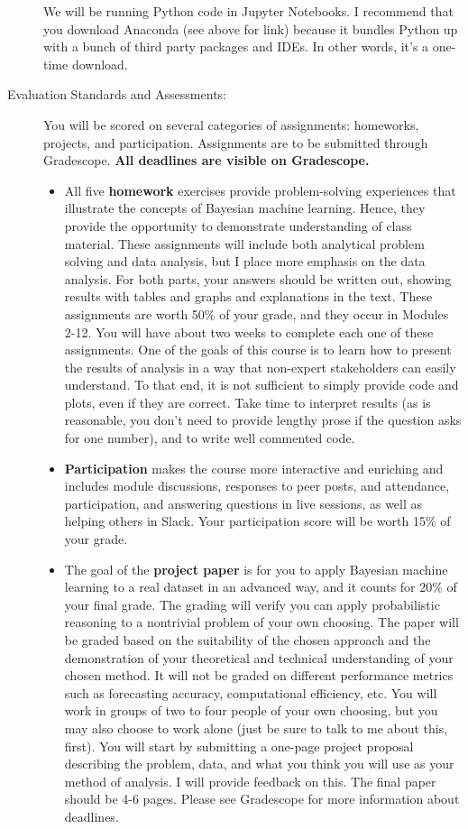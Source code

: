 \documentclass[11pt]{article}
\begin{document}
\begin{description}
We will be running Python code in Jupyter Notebooks. I recommend that you download Anaconda (see above for link) because it bundles Python up with a bunch of third party packages and IDEs. In other words, it's a one-time download. 

\item[Evaluation Standards and Assessments:] 

You will be scored on several categories of assignments: homeworks, projects, and participation. Assignments are to be submitted through Gradescope. {\bf All deadlines are visible on Gradescope.}

\begin{itemize}
\item All five {\bf homework} exercises provide problem-solving experiences that illustrate the concepts of Bayesian machine learning. Hence, they provide the opportunity to demonstrate understanding of class material. These assignments will include both analytical problem solving and data analysis, but I place more emphasis on the data analysis. For both parts, your answers should be written out, showing results with tables and graphs and explanations in the text. These assignments are worth 50\% of your grade, and they occur in Modules 2-12. You will have about two weeks to complete each one of these assignments. One of the goals of this course is to learn how to present the results of analysis in a way that non-expert stakeholders can easily understand. To that end, it is not sufficient to simply provide code and plots, even if they are correct. Take time to interpret results (as is reasonable, you don’t need to provide lengthy prose if the question asks for one number), and to write well commented code.
\item {\bf Participation} makes the course more interactive and enriching and includes module discussions, responses to peer posts, and attendance, participation, and answering questions in live sessions, as well as helping others in Slack. Your participation score will be worth 15\% of your grade. 
\item The goal of the {\bf project paper} is for you to apply Bayesian machine learning to a real dataset in an advanced way, and it counts for 20\% of your final grade. The grading will verify you can apply probabilistic reasoning to a nontrivial problem of your own choosing. The paper will be graded based on the suitability of the chosen approach and the demonstration of your theoretical and technical understanding of your chosen method. It will not be graded on different performance metrics such as forecasting accuracy, computational efficiency, etc. You will work in groups of two to four people of your own choosing, but you may also choose to work alone (just be sure to talk to me about this, first). You will start by submitting a one-page project proposal describing the problem, data, and what you think you will use as your method of analysis. I will provide feedback on this. The final paper should be 4-6 pages. Please see Gradescope for more information about deadlines. 

\end{itemize}
\end{description}
\end{document}
